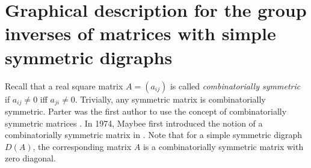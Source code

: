 \documentclass[notitlepage,12pt,reqno]{amsart}
\numberwithin{equation}{section}
\begin{document}



\section{Graphical description for the group inverses of matrices with simple symmetric digraphs}\label{section2}
Recall that a real square matrix $A=(a_{ij})$ is called {\it combinatorially symmetric} if $a_{ij}\neq 0$ iff $a_{ji}\neq 0$. Trivially, any symmetric matrix is combinatorially symmetric. Parter was the first author to use the concept of combinatorially symmetric matrices \cite{parter}. In 1974, Maybee first introduced the notion of a combinatorially symmetric matrix in \cite{maybee}. Note that for a simple symmetric digraph $D(A)$, the corresponding matrix $A$ is a combinatorially symmetric matrix with zero diagonal.
\end{document}
